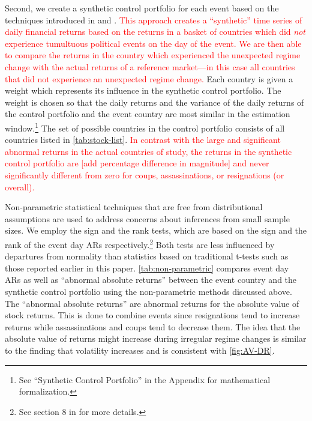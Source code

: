\documentclass[12pt,final,fleqn]{article}
\theoremstyle{plain}
\begin{document}
Second, we create a synthetic control portfolio for each event based on the techniques introduced in \citet{abadie2003economic} and \citet{abadie2010synthetic}. \textcolor{red}{This approach creates a ``synthetic'' time series of daily financial returns based on the returns in a basket of countries which did \textit{not} experience tumultuous political events on the day of the event. We are then able to compare the returns in the country which experienced the unexpected regime change with the actual returns of a reference market---in this case all countries that did not experience an unexpected regime change.} Each country is given a weight which represents its influence in the synthetic control portfolio. The weight is chosen so that the daily returns and the variance of the daily returns of the control portfolio and the event country are most similar in the estimation window.\footnote{See ``Synthetic Control Portfolio'' in the Appendix for mathematical formalization.} The set of possible countries in the control portfolio consists of all countries listed in \autoref{tab:stock-list}. \textcolor{red}{In contrast with the large and significant abnormal returns in the actual countries of study, the returns in the synthetic control portfolio are [add percentage difference in magnitude] and never significantly different from zero for coups, assassinations, or resignations (or overall).}

Non-parametric statistical techniques that are free from distributional assumptions are used to address concerns about inferences from small sample sizes. We employ the sign and the rank tests, which are based on the sign and the rank of the event day ARs respectively.\footnote{See section 8 in \citet{mackinlay1997event} for more details.} Both tests are less influenced by departures from normality than statistics based on traditional t-tests such as those reported earlier in this paper. \autoref{tab:non-parametric} compares event day ARs as well as ``abnormal absolute returns'' between the event country and the synthetic control portfolio using the non-parametric methods discussed above. The ``abnormal absolute returns'' are abnormal returns for the absolute value of stock returns. This is done to combine events since resignations tend to increase returns while assassinations and coups tend to decrease them. The idea that the absolute value of returns might increase during irregular regime changes is similar to the finding that volatility increases and is consistent with \autoref{fig:AV-DR}.
\end{document}
